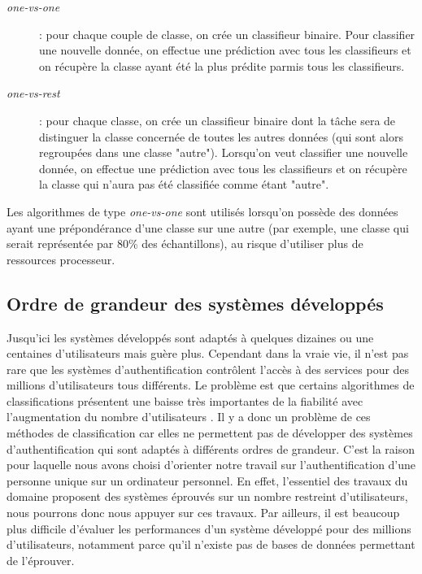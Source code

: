
\begin{description}
	\item[\textit{one-vs-one}] : pour chaque couple de classe, on crée un classifieur binaire. Pour classifier une nouvelle donnée, on effectue une prédiction avec tous les classifieurs et on récupère la classe ayant été la plus prédite parmis tous les classifieurs.
	\item[\textit{one-vs-rest}] : pour chaque classe, on crée un classifieur binaire dont la tâche sera de distinguer la classe concernée de toutes les autres données (qui sont alors regroupées dans une classe "autre"). Lorsqu'on veut classifier une nouvelle donnée, on effectue une prédiction avec tous les classifieurs et on récupère la classe qui n'aura pas été classifiée comme étant "autre".\\
\end{description}

Les algorithmes de type \textit{one-vs-one} sont utilisés lorsqu'on possède des données ayant une prépondérance d'une classe sur une autre (par exemple, une classe qui serait représentée par 80\% des échantillons), au risque d'utiliser plus de ressources processeur.\\

\subsection{Ordre de grandeur des systèmes développés}

Jusqu'ici les systèmes développés sont adaptés à quelques dizaines ou une centaines d'utilisateurs mais guère plus. Cependant dans la vraie vie, il n'est pas rare que les systèmes d'authentification contrôlent l'accès à des services pour des millions d'utilisateurs tous différents. Le problème est que certains algorithmes de classifications présentent une baisse très importantes de la fiabilité avec l'augmentation du nombre d'utilisateurs \cite{panasiuk2016}. Il y a donc un problème de ces méthodes de classification car elles ne permettent pas de développer des systèmes d'authentification qui sont adaptés à différents ordres de grandeur. C'est la raison pour laquelle nous avons choisi d'orienter notre travail sur l'authentification d'une personne unique sur un ordinateur personnel. En effet, l'essentiel des travaux du domaine proposent des systèmes éprouvés sur un nombre restreint d'utilisateurs, nous pourrons donc nous appuyer sur ces travaux. Par ailleurs, il est beaucoup plus difficile d'évaluer les performances d'un système développé pour des millions d'utilisateurs, notamment parce qu'il n'existe pas de bases de données permettant de l'éprouver.


